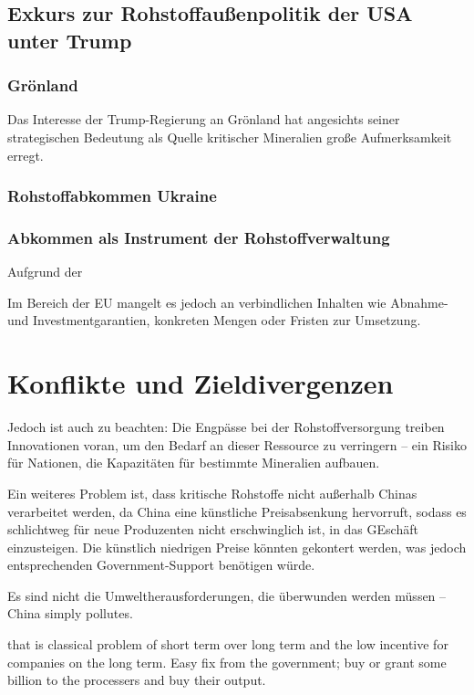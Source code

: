 \documentclass[12pt,a4paper,oneside]{book} %
\begin{document}
\subsection{Exkurs zur Rohstoffaußenpolitik der USA unter Trump}

\subsubsection{Grönland}

Das Interesse der Trump-Regierung an Grönland hat angesichts seiner strategischen Bedeutung als Quelle kritischer Mineralien große Aufmerksamkeit erregt.

\subsubsection{Rohstoffabkommen Ukraine}


\subsubsection{Abkommen als Instrument der Rohstoffverwaltung}


Aufgrund der 

Im Bereich der EU mangelt es jedoch an verbindlichen Inhalten wie Abnahme- und Investmentgarantien, konkreten Mengen oder Fristen zur Umsetzung.

\section{Konflikte und Zieldivergenzen}

Jedoch ist auch zu beachten: Die Engpässe bei der Rohstoffversorgung treiben Innovationen voran, um den Bedarf an dieser Ressource zu verringern – ein Risiko für Nationen, die Kapazitäten für bestimmte Mineralien aufbauen.

Ein weiteres Problem ist, dass kritische Rohstoffe nicht außerhalb Chinas verarbeitet werden, da China eine künstliche Preisabsenkung hervorruft, sodass es schlichtweg für neue Produzenten nicht erschwinglich ist, in das GEschäft einzusteigen. Die künstlich niedrigen Preise könnten gekontert werden, was jedoch entsprechenden Government-Support benötigen würde.

Es sind nicht die Umweltherausforderungen, die überwunden werden müssen -- China simply pollutes.



that is classical problem of short term over long term and the low incentive for companies on the long term. Easy fix from the government; buy or grant some billion to the processers and buy their output.
\end{document}
